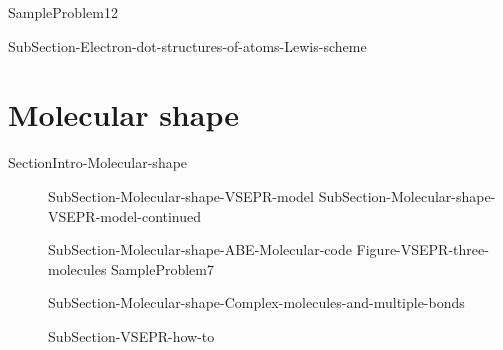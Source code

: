 \documentclass[main.tex]{subfiles}
\newcommand\chapterlabel{Ch-naming}\setcounter{figurenewcounter}{0}\setcounter{tablenewcounter}{0}\setcounter{formulanewcounter}{0}\chapterpicture{../{\chapterlabel}/figure1}\chapterpicturelabel{Pixnio}
\begin{document}
{\begin{description}
{SampleProblem12}

\item[\docfilehook{Steps to obtain Lewis structures}{}]{SubSection-Electron-dot-structures-of-atoms-Lewis-scheme}  

\end{description}

 \section{Molecular shape}{SectionIntro-Molecular-shape}
\sloppy\begin{description}
\item[] {SubSection-Molecular-shape-VSEPR-model}
 \hspace{10cm}{Figure-VSEPR-three-molecules-one}
 {SubSection-Molecular-shape-VSEPR-model-continued}
\item[] {SubSection-Molecular-shape-ABE-Molecular-code}
{Figure-VSEPR-three-molecules}
{SampleProblem7}

\item[] {SubSection-Molecular-shape-Complex-molecules-and-multiple-bonds}
\item[]{SubSection-VSEPR-how-to}  
\newpage  \hspace{0cm}{Table-Molecular-geometries}

\end{description}


}
\end{document}

